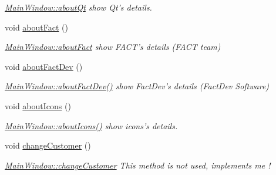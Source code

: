 \begin{DoxyCompactItemize}
\begin{DoxyCompactList}\small\item\em \hyperlink{classMainWindow_a4710d90108bd39f7b80bdc6c3a1b1aef}{Main\+Window\+::about\+Qt} show Qt's details. \end{DoxyCompactList}\item 
\hypertarget{classMainWindow_a82e1b6ba63283af94f37684cf14b5c66}{void \hyperlink{classMainWindow_a82e1b6ba63283af94f37684cf14b5c66}{about\+Fact} ()}\label{classMainWindow_a82e1b6ba63283af94f37684cf14b5c66}

\begin{DoxyCompactList}\small\item\em \hyperlink{classMainWindow_a82e1b6ba63283af94f37684cf14b5c66}{Main\+Window\+::about\+Fact} show F\+A\+C\+T's details (F\+A\+C\+T team) \end{DoxyCompactList}\item 
\hypertarget{classMainWindow_af9af9644d45d2af769d18f2370eed83e}{void \hyperlink{classMainWindow_af9af9644d45d2af769d18f2370eed83e}{about\+Fact\+Dev} ()}\label{classMainWindow_af9af9644d45d2af769d18f2370eed83e}

\begin{DoxyCompactList}\small\item\em \hyperlink{classMainWindow_af9af9644d45d2af769d18f2370eed83e}{Main\+Window\+::about\+Fact\+Dev()} show Fact\+Dev's details (Fact\+Dev Software) \end{DoxyCompactList}\item 
\hypertarget{classMainWindow_ae6a7598b9931ca8901a62bb95c490e0e}{void \hyperlink{classMainWindow_ae6a7598b9931ca8901a62bb95c490e0e}{about\+Icons} ()}\label{classMainWindow_ae6a7598b9931ca8901a62bb95c490e0e}

\begin{DoxyCompactList}\small\item\em \hyperlink{classMainWindow_ae6a7598b9931ca8901a62bb95c490e0e}{Main\+Window\+::about\+Icons()} show icons's details. \end{DoxyCompactList}\item 
\hypertarget{classMainWindow_afa850634f7968a6e9803a25e905f3178}{void \hyperlink{classMainWindow_afa850634f7968a6e9803a25e905f3178}{change\+Customer} ()}\label{classMainWindow_afa850634f7968a6e9803a25e905f3178}

\begin{DoxyCompactList}\small\item\em \hyperlink{classMainWindow_afa850634f7968a6e9803a25e905f3178}{Main\+Window\+::change\+Customer} This method is not used, implements me ! \end{DoxyCompactList}\end{DoxyCompactItemize}
